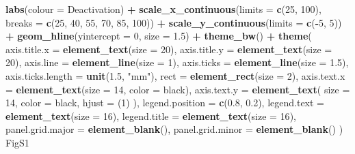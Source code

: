 \documentclass[
]{krantz}
\makeatletter
\newenvironment{Shaded}{\begin{snugshade}}{\end{snugshade}}
\newcommand{\DataTypeTok}[1]{\textcolor[rgb]{0.13,0.29,0.53}{#1}}
\newcommand{\DecValTok}[1]{\textcolor[rgb]{0.00,0.00,0.81}{#1}}
\newcommand{\FloatTok}[1]{\textcolor[rgb]{0.00,0.00,0.81}{#1}}
\newcommand{\KeywordTok}[1]{\textcolor[rgb]{0.13,0.29,0.53}{\textbf{#1}}}
\newcommand{\NormalTok}[1]{#1}
\newcommand{\OperatorTok}[1]{\textcolor[rgb]{0.81,0.36,0.00}{\textbf{#1}}}
\newcommand{\StringTok}[1]{\textcolor[rgb]{0.31,0.60,0.02}{#1}}
\newenvironment{kframe}{%
\medskip{}
\setlength{\fboxsep}{.8em}
 \def\at@end@of@kframe{}%
 \ifinner\ifhmode%
  \def\at@end@of@kframe{\end{minipage}}%
  \begin{minipage}{\columnwidth}%
 \fi\fi%
 \def\FrameCommand##1{\hskip\@totalleftmargin \hskip-\fboxsep
 \colorbox{shadecolor}{##1}\hskip-\fboxsep
     \hskip-\linewidth \hskip-\@totalleftmargin \hskip\columnwidth}%
 \MakeFramed {\advance\hsize-\width
   \@totalleftmargin\z@ \linewidth\hsize
   \@setminipage}}%
 {\par\unskip\endMakeFramed%
 \at@end@of@kframe}
\renewenvironment{Shaded}{\begin{kframe}}{\end{kframe}}
\makeatother
\begin{document}
\begin{Shaded}
\begin{Highlighting}[]
\StringTok{  }\KeywordTok{labs}\NormalTok{(}\DataTypeTok{colour =} \StringTok{\textquotesingle{}Deactivation\textquotesingle{}}\NormalTok{) }\OperatorTok{+}
\StringTok{  }\KeywordTok{scale\_x\_continuous}\NormalTok{(}\DataTypeTok{limits =} \KeywordTok{c}\NormalTok{(}\DecValTok{25}\NormalTok{, }\DecValTok{100}\NormalTok{),}
                     \DataTypeTok{breaks =} \KeywordTok{c}\NormalTok{(}\DecValTok{25}\NormalTok{, }\DecValTok{40}\NormalTok{, }\DecValTok{55}\NormalTok{, }\DecValTok{70}\NormalTok{, }\DecValTok{85}\NormalTok{, }\DecValTok{100}\NormalTok{)) }\OperatorTok{+}
\StringTok{  }\KeywordTok{scale\_y\_continuous}\NormalTok{(}\DataTypeTok{limits =} \KeywordTok{c}\NormalTok{(}\OperatorTok{{-}}\DecValTok{5}\NormalTok{, }\DecValTok{5}\NormalTok{)) }\OperatorTok{+}
\StringTok{  }\KeywordTok{geom\_hline}\NormalTok{(}\DataTypeTok{yintercept =} \DecValTok{0}\NormalTok{, }\DataTypeTok{size =} \FloatTok{1.5}\NormalTok{) }\OperatorTok{+}
\StringTok{  }\KeywordTok{theme\_bw}\NormalTok{() }\OperatorTok{+}
\StringTok{  }\KeywordTok{theme}\NormalTok{(}
    \DataTypeTok{axis.title.x =} \KeywordTok{element\_text}\NormalTok{(}\DataTypeTok{size =} \DecValTok{20}\NormalTok{),}
    \DataTypeTok{axis.title.y =} \KeywordTok{element\_text}\NormalTok{(}\DataTypeTok{size =} \DecValTok{20}\NormalTok{),}
    \DataTypeTok{axis.line =} \KeywordTok{element\_line}\NormalTok{(}\DataTypeTok{size =} \DecValTok{1}\NormalTok{),}
    \DataTypeTok{axis.ticks =} \KeywordTok{element\_line}\NormalTok{(}\DataTypeTok{size =} \FloatTok{1.5}\NormalTok{),}
    \DataTypeTok{axis.ticks.length =} \KeywordTok{unit}\NormalTok{(}\FloatTok{1.5}\NormalTok{, }\StringTok{"mm"}\NormalTok{),}
    \DataTypeTok{rect =} \KeywordTok{element\_rect}\NormalTok{(}\DataTypeTok{size =} \DecValTok{2}\NormalTok{),}
    \DataTypeTok{axis.text.x =} \KeywordTok{element\_text}\NormalTok{(}\DataTypeTok{size =} \DecValTok{14}\NormalTok{, }\DataTypeTok{color =} \StringTok{\textquotesingle{}black\textquotesingle{}}\NormalTok{),}
    \DataTypeTok{axis.text.y =}
      \KeywordTok{element\_text}\NormalTok{(}
        \DataTypeTok{size =} \DecValTok{14}\NormalTok{,}
        \DataTypeTok{color =} \StringTok{\textquotesingle{}black\textquotesingle{}}\NormalTok{,}
        \DataTypeTok{hjust =}\NormalTok{ (}\DecValTok{1}\NormalTok{)}
\NormalTok{      ),}
    \DataTypeTok{legend.position =} \KeywordTok{c}\NormalTok{(}\FloatTok{0.8}\NormalTok{, }\FloatTok{0.2}\NormalTok{),}
    \DataTypeTok{legend.text =} \KeywordTok{element\_text}\NormalTok{(}\DataTypeTok{size =} \DecValTok{16}\NormalTok{),}
    \DataTypeTok{legend.title =} \KeywordTok{element\_text}\NormalTok{(}\DataTypeTok{size =} \DecValTok{16}\NormalTok{),}
    \DataTypeTok{panel.grid.major =} \KeywordTok{element\_blank}\NormalTok{(),}
    \DataTypeTok{panel.grid.minor =} \KeywordTok{element\_blank}\NormalTok{()}
\NormalTok{  )}
\NormalTok{FigS1}
\end{Highlighting}
\end{Shaded}
\end{document}
